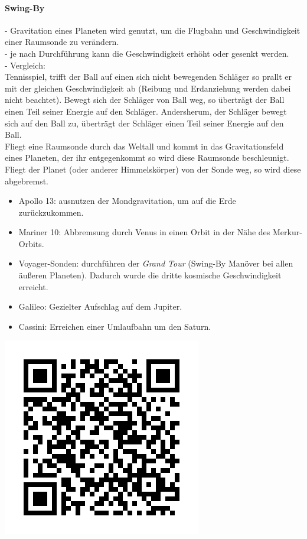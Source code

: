 \documentclass[12pt,a4paper]{article}
\begin{document}
\paragraph{Swing-By}
\begin{flushleft}
- Gravitation eines Planeten wird genutzt, um die Flugbahn und Geschwindigkeit einer Raumsonde zu verändern.\\
- je nach Durchführung kann die Geschwindigkeit erhöht oder gesenkt werden.\\
- Vergleich:\\
Tennisspiel, trifft der Ball auf einen sich nicht bewegenden Schläger so prallt er mit der gleichen Geschwindigkeit ab (Reibung und Erdanziehung werden dabei nicht beachtet). Bewegt sich der Schläger von Ball weg, so überträgt der Ball einen Teil seiner Energie auf den Schläger. Andersherum, der Schläger bewegt sich auf den Ball zu, überträgt der Schläger einen Teil seiner Energie auf den Ball.\\
Fliegt eine Raumsonde durch das Weltall und kommt in das Gravitationsfeld eines Planeten, der ihr entgegenkommt so wird diese Raumsonde beschleunigt. Fliegt der Planet (oder anderer Himmelskörper) von der Sonde weg, so wird diese abgebremst.
\end{flushleft}
\begin{itemize}
\item Apollo 13: ausnutzen der Mondgravitation, um auf die Erde zurückzukommen.
\item Mariner 10: Abbremsung durch Venus in einen Orbit in der Nähe des Merkur-Orbits.
\item Voyager-Sonden: durchführen der \textit{Grand Tour} (Swing-By Manöver bei allen äußeren Planeten). Dadurch wurde die dritte kosmische Geschwindigkeit erreicht.
\item Galileo: Gezielter Aufschlag auf dem Jupiter.
\item Cassini: Erreichen einer Umlaufbahn um den Saturn.
\end{itemize}
\includegraphics[scale=.5]{qr.png} 
\end{document}
